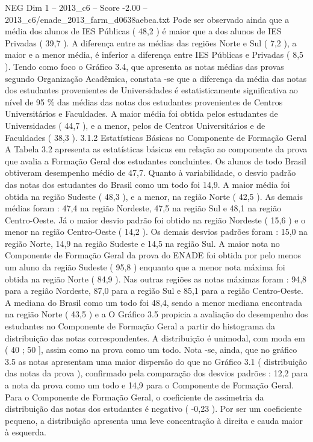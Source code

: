 \begin{textsample}{NEG Dim 1 – 2013\_c6 – Score -2.00 – 2013\_c6/enade\_2013\_farm\_d0638aebea.txt}
Pode ser observado ainda que a média dos alunos de IES Públicas ( 48,2 ) é maior que a dos alunos de IES Privadas ( 39,7 ).
A diferença entre as médias das regiões Norte e Sul ( 7,2 ), a maior e a menor média, é inferior a diferença entre IES Públicas e Privadas ( 8,5 ).
Tendo como foco o Gráfico 3.4, que apresenta as notas médias das provas segundo Organização Acadêmica, constata -se que a diferença da média das notas dos estudantes provenientes de Universidades é estatisticamente significativa ao nível de 95 \% das médias das notas dos estudantes provenientes de Centros Universitários e Faculdades.
A maior média foi obtida pelos estudantes de Universidades ( 44,7 ), e a menor, pelos de Centros Universitários e de Faculdades ( 38,3 ). 3.1.2 Estatísticas Básicas no Componente de Formação Geral A Tabela 3.2 apresenta as estatísticas básicas em relação ao componente da prova que avalia a Formação Geral dos estudantes concluintes.
Os alunos de todo Brasil obtiveram desempenho médio de 47,7.
Quanto à variabilidade, o desvio padrão das notas dos estudantes do Brasil como um todo foi 14,9.
A maior média foi obtida na região Sudeste ( 48,3 ), e a menor, na região Norte ( 42,5 ).
As demais médias foram : 47,4 na região Nordeste, 47,5 na região Sul e 48,1 na região Centro-Oeste.
Já o maior desvio padrão foi obtido na região Nordeste ( 15,6 ) e o menor na região Centro-Oeste ( 14,2 ).
Os demais desvios padrões foram : 15,0 na região Norte, 14,9 na região Sudeste e 14,5 na região Sul.
A maior nota no Componente de Formação Geral da prova do ENADE foi obtida por pelo menos um aluno da região Sudeste ( 95,8 ) enquanto que a menor nota máxima foi obtida na região Norte ( 84,9 ).
Nas outras regiões as notas máximas foram : 94,8 para a região Nordeste, 87,0 para a região Sul e 85,1 para a região Centro-Oeste.
A mediana do Brasil como um todo foi 48,4, sendo a menor mediana encontrada na região Norte ( 43,5 ) e a O Gráfico 3.5 propicia a avaliação do desempenho dos estudantes no Componente de Formação Geral a partir do histograma da distribuição das notas correspondentes.
A distribuição é unimodal, com moda em ( 40 ; 50 ], assim como na prova como um todo.
Nota -se, ainda, que no gráfico 3.5 as notas apresentam uma maior dispersão do que no Gráfico 3.1 ( distribuição das notas da prova ), confirmado pela comparação dos desvios padrões : 12,2 para a nota da prova como um todo e 14,9 para o Componente de Formação Geral.
Para o Componente de Formação Geral, o coeficiente de assimetria da distribuição das notas dos estudantes é negativo ( -0,23 ).
Por ser um coeficiente pequeno, a distribuição apresenta uma leve concentração à direita e cauda maior à esquerda.

\end{textsample}
